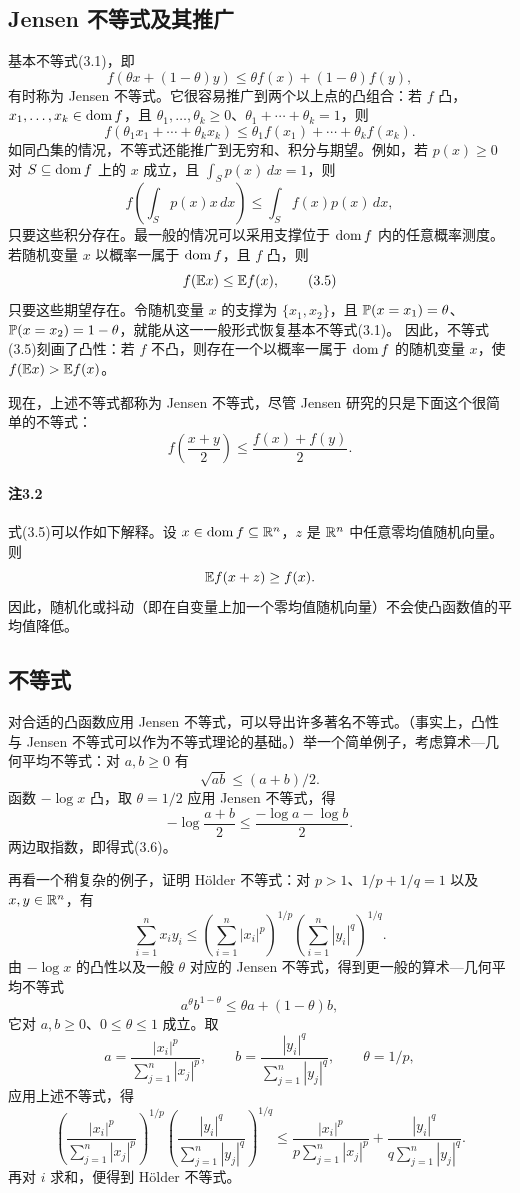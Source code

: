 \subsection{Jensen 不等式及其推广}
基本不等式(3.1)，即
\[f(\theta x+(1-\theta)y)\leq\theta f(x)+(1-\theta)f(y),\]
有时称为 Jensen 不等式。它很容易推广到两个以上点的凸组合：若 $f$ 凸，$x_1,\ldots,x_k\in\operatorname{dom} f$，且 $\theta_1,\ldots,\theta_k\geq0$、$\theta_1+\cdots+\theta_k=1$，则
\[f(\theta_1x_1+\cdots+\theta_kx_k)\leq\theta_1f(x_1)+\cdots+\theta_kf(x_k).\]
如同凸集的情况，不等式还能推广到无穷和、积分与期望。例如，若 $p(x)\geq0$ 对 $S\subseteq\operatorname{dom} f$ 上的 $x$ 成立，且 $\int_S p(x)\,dx=1$，则
\[f\left(\int_S p(x)x\,dx\right)\leq\int_S f(x)p(x)\,dx,\]
只要这些积分存在。最一般的情况可以采用支撑位于 $\operatorname{dom} f$ 内的任意概率测度。若随机变量 $x$ 以概率一属于 $\operatorname{dom} f$，且 $f$ 凸，则
\begin{equation}f(\mathbb E x)\leq\mathbb E f(x),\tag{3.5}\end{equation}
只要这些期望存在。令随机变量 $x$ 的支撑为 $\{x_1,x_2\}$，且 $\mathbb P(x=x_1)=\theta$、$\mathbb P(x=x_2)=1-\theta$，就能从这一一般形式恢复基本不等式(3.1)。
因此，不等式(3.5)刻画了凸性：若 $f$ 不凸，则存在一个以概率一属于 $\operatorname{dom} f$ 的随机变量 $x$，使 $f(\mathbb E x)>\mathbb E f(x)$。

现在，上述不等式都称为 Jensen 不等式，尽管 Jensen 研究的只是下面这个很简单的不等式：
\[f\left(\frac{x+y}2\right)\leq\frac{f(x)+f(y)}2.\]
\paragraph{注3.2}式(3.5)可以作如下解释。设 $x\in\operatorname{dom} f\subseteq\mathbb R^n$，$z$ 是 $\mathbb R^n$ 中任意零均值随机向量。则
\[\mathbb E f(x+z)\geq f(x).\]
因此，随机化或抖动（即在自变量上加一个零均值随机向量）不会使凸函数值的平均值降低。

\subsection{不等式}
对合适的凸函数应用 Jensen 不等式，可以导出许多著名不等式。（事实上，凸性与 Jensen 不等式可以作为不等式理论的基础。）举一个简单例子，考虑算术—几何平均不等式：对 $a,b\geq0$ 有
\begin{equation}\sqrt{ab}\leq(a+b)/2.\tag{3.6}\end{equation}
函数 $-\log x$ 凸，取 $\theta=1/2$ 应用 Jensen 不等式，得
\[-\log\frac{a+b}2\leq\frac{-\log a-\log b}2.\]
两边取指数，即得式(3.6)。

再看一个稍复杂的例子，证明 Hölder 不等式：对 $p>1$、$1/p+1/q=1$ 以及 $x,y\in\mathbb R^n$，有
\[
 \sum_{i=1}^n x_iy_i\leq
 \left(\sum_{i=1}^n|x_i|^p\right)^{1/p}
 \left(\sum_{i=1}^n|y_i|^q\right)^{1/q}.
\]
由 $-\log x$ 的凸性以及一般 $\theta$ 对应的 Jensen 不等式，得到更一般的算术—几何平均不等式
\[a^\theta b^{1-\theta}\leq\theta a+(1-\theta)b,\]
它对 $a,b\geq0$、$0\leq\theta\leq1$ 成立。取
\[a=\frac{|x_i|^p}{\sum_{j=1}^n|x_j|^p},\qquad
 b=\frac{|y_i|^q}{\sum_{j=1}^n|y_j|^q},\qquad\theta=1/p,\]
应用上述不等式，得
\[
 \left(\frac{|x_i|^p}{\sum_{j=1}^n|x_j|^p}\right)^{1/p}
 \left(\frac{|y_i|^q}{\sum_{j=1}^n|y_j|^q}\right)^{1/q}
 \leq\frac{|x_i|^p}{p\sum_{j=1}^n|x_j|^p}
       +\frac{|y_i|^q}{q\sum_{j=1}^n|y_j|^q}.
\]
再对 $i$ 求和，便得到 Hölder 不等式。
